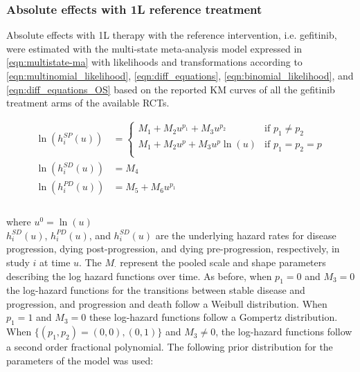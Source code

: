 \documentclass[11pt,final,fleqn]{article}\usepackage[]{graphicx}\usepackage[]{color}
\theoremstyle{plain}
\begin{document}
{\subsubsection{Absolute effects with 1L reference treatment}
Absolute effects with 1L therapy with the reference intervention, i.e. gefitinib, were estimated with the multi-state meta-analysis model expressed in \autoref{eqn:multistate-ma} with likelihoods and transformations according to \autoref{eqn:multinomial_likelihood}, \autoref{eqn:diff_equations}, \autoref{eqn:binomial_likelihood}, and \autoref{eqn:diff_equations_OS} based on the reported KM curves of all the gefitinib treatment arms of the available RCTs.

\begin{equation}\label{eqn:multistate-ma}
\begin{aligned} 
\ln\left(h_{i}^{SP}(u)\right) &= 
\begin{cases}
M_{1} + M_{2}u^{p_1} + M_{3}u^{p_2} & \text{if } p_1 \neq p_2 \\ 
M_{1} + M_{2}u^{p} + M_{3}u^{p}\ln(u) & \text{if } p_1 = p_2 = p \\ 
\end{cases}\\ 
\ln\left(h_{i}^{SD}(u)\right) &=
M_{4}\\
\ln\left(h_{i}^{PD}(u)\right) &=
M_{5} + M_{6}u^{p_1}\\ 
\\
\end{aligned}
\end{equation}

where $u^0= \ln(u)$
\\

$h_{i}^{SD}(u)$, $h_{i}^{PD}(u)$, and $h_{i}^{SD}(u)$ are the underlying hazard rates for disease progression, dying post-progression, and dying pre-progression, respectively, in study $i$ at time $u$. The $M_{\cdot}$ represent the pooled scale and shape parameters describing the log hazard functions over time. As before, when $p_{1}=0$ and $M_{3}=0$ the log-hazard functions for the transitions between stable disease and progression, and progression and death follow a Weibull distribution. When $p_{1}=1$ and $M_{3}=0$ these log-hazard functions follow a Gompertz distribution. When $\{(p_1, p_2) = (0, 0), (0,1)\}$ and $M_{3}\neq0$, the log-hazard functions follow a second order fractional polynomial. The following prior distribution for the parameters of the model was used:

}
\end{document}

